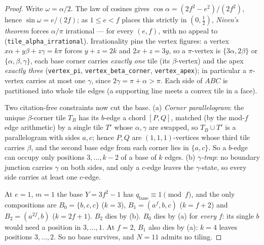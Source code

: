 \documentclass[11pt,reqno]{amsart}
\theoremstyle{plain}
\theoremstyle{definition}
\begin{document}
\begin{proof}
Write $\omega=\alpha/2$. The law of cosines gives $\cos\alpha=(2f^2-e^2)/(2f^2)$, hence
$\sin\omega=e/(2f)$; as $1\le e<f$ places this strictly in $(0,\tfrac12)$, \emph{Niven's theorem}
forces $\alpha/\pi$ irrational --- for every $(e,f)$, with no appeal to \cite{Laczkovich1995}
(\texttt{tile\_alpha\_irrational}). Irrationality pins the vertex figures: a vertex
$x\alpha+y\beta+z\gamma=k\pi$ forces $y+z=2k$ and $2x+z=3y$, so a $\pi$-vertex is $\{3\alpha,2\beta\}$
or $\{\alpha,\beta,\gamma\}$, each base corner carries \emph{exactly one} tile (its $\beta$-vertex) and
the apex \emph{exactly three} (\texttt{vertex\_pi}, \texttt{vertex\_beta\_corner},
\texttt{vertex\_apex}); in particular a $\pi$-vertex carries at most one $\gamma$, since
$2\gamma=\pi+\alpha>\pi$. Each side of $ABC$ is partitioned into whole tile edges (a supporting line
meets a convex tile in a face).

Two citation-free constraints now cut the base. (a) \emph{Corner parallelogram}: the unique
$\beta$-corner tile $T_B$ has its $b$-edge a chord $[P,Q]$, matched (by the mod-$f$ edge arithmetic)
by a single tile $T'$ whose $\alpha,\gamma$ are swapped, so $T_B\cup T'$ is a parallelogram with sides
$a,c$; hence $P,Q$ are $(1,1,1)$-vertices whose third tile carries $\beta$, and the second base edge
from each corner lies in $\{a,c\}$. So a $b$-edge can occupy only positions $3,\dots,k-2$ of a base of
$k$ edges. (b) \emph{$\gamma$-trap}: no boundary junction carries $\gamma$ on both sides, and only a
$c$-edge leaves the $\gamma$-state, so every side carries at least one $c$-edge.

At $e=1$, $m=1$ the base $Y=3f^2-1$ has $q_{\mathrm{base}}\equiv1\pmod f$, and the only compositions
are $B_0=\{b,c,c\}$ ($k=3$), $B_1=(a^{f},b,c)$ ($k=f+2$) and $B_2=(a^{2f},b)$ ($k=2f+1$). $B_2$ dies
by (b). $B_0$ dies by (a) for \emph{every} $f$: its single $b$ would need a position in
$3,\dots,1$. At $f=2$, $B_1$ also dies by (a): $k=4$ leaves positions $3,\dots,2$. So no base
survives, and $N=11$ admits no tiling. \qedhere
\end{proof}
\end{document}

